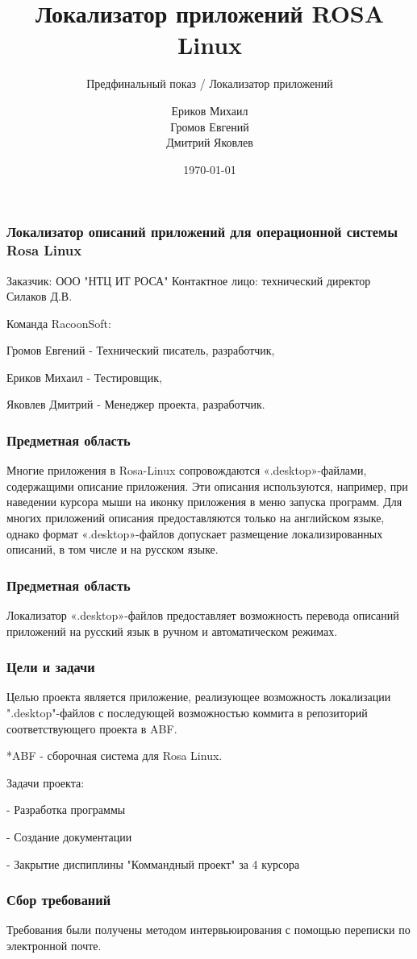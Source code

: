 \documentclass{beamer}
\title[Заголовок]{Локализатор приложений ROSA Linux}
\subtitle{Предфинальный показ / Локализатор приложений}
\author[RacoonSoft]{Ериков Михаил \\ Громов Евгений \\ Дмитрий Яковлев}
\institute[Высшая школа экономики]{Команда RacoonSoft \\ Национальный исследовательский университет \\ «Высшая школа экономики» (Москва)}
\date{\today}
\begin{document}
	

\frame[plain]{\titlepage}	

\begin{frame}
\frametitle{Локализатор описаний приложений для операционной системы Rosa Linux}

Заказчик: ООО "НТЦ ИТ РОСА"
Контактное лицо: технический директор Силаков Д.В.

Команда RacoonSoft:

Громов Евгений - Технический писатель, разработчик,

Ериков Михаил - Тестировщик,

Яковлев Дмитрий - Менеджер проекта, разработчик.

\end{frame}
\begin{frame}
\frametitle{Предметная область}

Многие приложения в Rosa-Linux сопровождаются «.desktop»-файлами, содержащими описание приложения. 
Эти описания используются, например, при наведении курсора мыши на иконку приложения в меню запуска программ.
Для многих приложений описания предоставляются только на английском языке, однако формат «.desktop»-файлов 
допускает размещение локализированных описаний, в том числе и на русском языке.
\end{frame}
\begin{frame}
\frametitle{Предметная область}
Локализатор «.desktop»-файлов предоставляет возможность перевода описаний приложений на русский язык в ручном и автоматическом режимах.
\end{frame}
\begin{frame}
\frametitle{Цели и задачи}

Целью проекта является приложение, реализующее возможность локализации ".desktop"-файлов с 
последующей возможностью коммита в репозиторий соответствующего проекта в ABF.

*ABF - сборочная система для Rosa Linux.

Задачи проекта:

- Разработка программы

- Создание документации

- Закрытие диспиплины "Коммандный проект" за 4 курсора
\end{frame}
\begin{frame}
\frametitle{Сбор требований}

Требования были получены методом интервьюирования с помощью переписки по электронной почте.

\end{frame}
\end{document}
